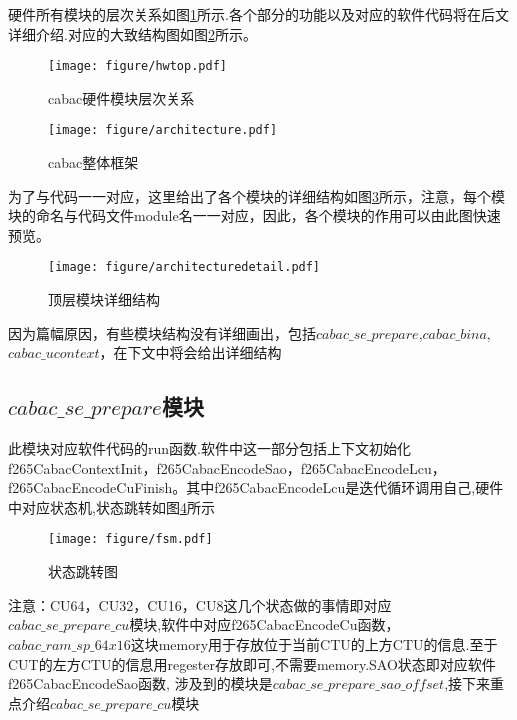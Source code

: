 \documentclass[UTF8,a4paper,12pt]{ctexart}
\begin{document}
硬件所有模块的层次关系如图\ref{fig9}所示.各个部分的功能以及对应的软件代码将在后文详细介绍.对应的大致结构图如图\ref{fig13}所示。
\begin{figure}[H]
\centering
\texttt{[image: figure/hwtop.pdf]}
\caption{cabac硬件模块层次关系}\label{fig9}
\end{figure}

\begin{figure}[H]
\centering
\texttt{[image: figure/architecture.pdf]}
\caption{cabac整体框架}\label{fig13}
\end{figure}

为了与代码一一对应，这里给出了各个模块的详细结构如图\ref{fig14}所示，注意，每个模块的命名与代码文件module名一一对应，因此，各个模块的作用可以由此图快速预览。
\begin{figure}[H]
\centering
\texttt{[image: figure/architecturedetail.pdf]}
\caption{顶层模块详细结构}\label{fig14}
\end{figure}
因为篇幅原因，有些模块结构没有详细画出，包括$cabac\_se\_prepare$,$cabac\_bina$,$cabac\_ucontext$，在下文中将会给出详细结构

\subsection{$cabac\_se\_prepare$模块}
此模块对应软件代码的run函数.软件中这一部分包括上下文初始化f265CabacContextInit，f265CabacEncodeSao，f265CabacEncodeLcu，f265CabacEncodeCuFinish。其中f265CabacEncodeLcu是迭代循环调用自己,硬件中对应状态机,状态跳转如图\ref{fig10}所示
\begin{figure}[H]
\centering
\texttt{[image: figure/fsm.pdf]}
\caption{状态跳转图}\label{fig10}
\end{figure}
注意：CU64，CU32，CU16，CU8这几个状态做的事情即对应$cabac\_se\_prepare\_cu$模块,软件中对应f265CabacEncodeCu函数，$cabac\_ram\_sp\_64x16$这块memory用于存放位于当前CTU的上方CTU的信息.至于CUT的左方CTU的信息用regester存放即可,不需要memory.SAO状态即对应软件f265CabacEncodeSao函数, 涉及到的模块是$cabac\_se\_prepare\_sao\_offset$,接下来重点介绍$cabac\_se\_prepare\_cu$模块
\end{document}
